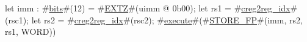 let imm : #\hyperref[sailRISCVzbits]{bits}#(12) = #\hyperref[sailRISCVzEXTZ]{EXTZ}#(uimm @ 0b00);
let rs1 = #\hyperref[sailRISCVzcreg2regzyidx]{creg2reg\_idx}#(rsc1);
let rs2 = #\hyperref[sailRISCVzcreg2regzyidx]{creg2reg\_idx}#(rsc2);
#\hyperref[sailRISCVzexecute]{execute}#(#\hyperref[sailRISCVzSTOREzyFP]{STORE\_FP}#(imm, rs2, rs1, WORD))
